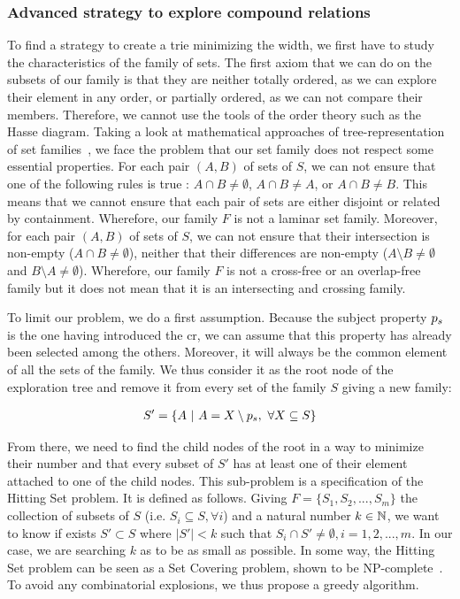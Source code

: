\subsubsection{Advanced strategy to explore compound relations}

To find a strategy to create a trie minimizing the width, we first have to study the characteristics of the family of sets.
The first axiom that we can do on the subsets of our family is that they are neither totally ordered, as we can explore their element in any order, or partially ordered, as we can not compare their members. Therefore, we cannot use the tools of the order theory such as the Hasse diagram. Taking a look at mathematical approaches of tree-representation of set families~\cite{bui_2008_tree}, we face the problem that our set family does not respect some essential properties. For each pair $(A, B)$ of sets of $S$, we can not ensure that one of the following rules is true : $A \cap B \neq \emptyset$, $A \cap B \neq A$, or $A \cap B \neq B$. This means that we cannot ensure that each pair of sets are either disjoint or related by containment. Wherefore, our family $F$ is not a laminar set family.
Moreover, for each pair $(A, B)$ of sets of $S$, we can not ensure that their intersection is non-empty ($A \cap B \neq \emptyset$), neither that their differences are non-empty ($A \setminus B \neq \emptyset$ and $B \setminus A \neq \emptyset$). Wherefore, our family $F$ is not a cross-free or an overlap-free family but it does not mean that it is an intersecting and crossing family.

To limit our problem, we do a first assumption. Because the subject property $p_s$ is the one having introduced the \acrshort{cr}, we can assume that this property has already been selected among the others. Moreover, it will always be the common element of all the sets of the family. We thus consider it as the root node of the exploration tree and remove it from every set of the family $S$ giving a new family:

\begin{align*}
S' = \{A\ |\ A = X \setminus p_s,\ \forall X \subseteq S\}
\end{align*}

From there, we need to find the child nodes of the root in a way to minimize their number and that every subset of $S'$ has at least one of their element attached to one of the child nodes. This sub-problem is a specification of the Hitting Set problem. It is defined as follows. Giving $F = \{S_1,S_2,...,S_m\}$ the collection of subsets of $S$ (i.e. $S_i \subseteq S, \forall i$) and a natural number $k \in \mathbb{N}$, we want to know if exists $S' \subset S$ where $|S'| < k$ such that $S_i \cap S' \neq \emptyset, i = 1,2,...,m$. In our case, we are searching $k$ as to be as small as possible. In some way, the Hitting Set problem can be seen as a Set Covering problem, shown to be NP-complete~\cite{karp_1972_reducibility}. To avoid any combinatorial explosions, we thus propose a greedy algorithm.

